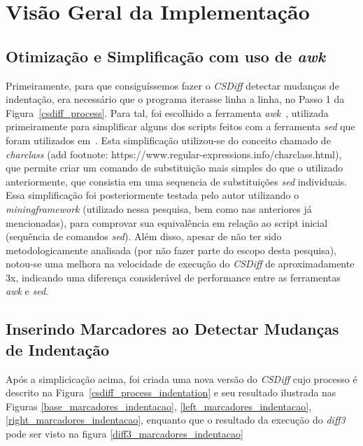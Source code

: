 \section{Visão Geral da Implementação}
\subsection{Otimização e Simplificação com uso de \emph{awk}}
Primeiramente, para que consiguíssemos fazer o \emph{CSDiff} detectar mudanças de indentação, era necessário
que o programa iterasse linha a linha, no Passo 1 da Figura~\ref{csdiff_process}.
Para tal, foi escolhido a ferramenta \emph{awk}~\cite{awk}, utilizada primeiramente para
simplificar alguns dos scripts feitos com a ferramenta \emph{sed} que foram utilizados em~\cite{clem21,heitor21}.
Esta simplificação
utilizou-se do conceito chamado de \emph{charclass} (add footnote: https://www.regular-expressions.info/charclass.html), que
permite criar um comando de substituição mais simples do que o utilizado anteriormente, que consistia em uma sequencia de
substituições \emph{sed} individuais. Essa simplificação foi posteriormente testada pelo autor utilizando
o \emph{miningframework} (utilizado nessa pesquisa, bem como nas anteriores já mencionadas), para comprovar sua equivalência em
relação ao script inicial (sequência de comandos \emph{sed}). Além disso, apesar de não ter sido
metodologicamente analisada (por não fazer parte do escopo desta pesquisa),
notou-se uma melhora na velocidade de execução do
\emph{CSDiff} de aproximadamente 3x, indicando uma diferença considerável de performance entre as ferramentas
\emph{awk} e \emph{sed}.

\subsection{Inserindo Marcadores ao Detectar Mudanças de Indentação}
Após a simplicicação acima, foi criada uma nova versão do \emph{CSDiff} cujo processo é descrito na
Figura~\ref{csdiff_process_indentation} e seu resultado ilustrada nas Figuras \ref{base_marcadores_indentacao},
\ref{left_marcadores_indentacao},
\ref{right_marcadores_indentacao}, enquanto que o resultado da execução do \emph{diff3} pode ser visto na figura
\ref{diff3_marcadores_indentacao}

